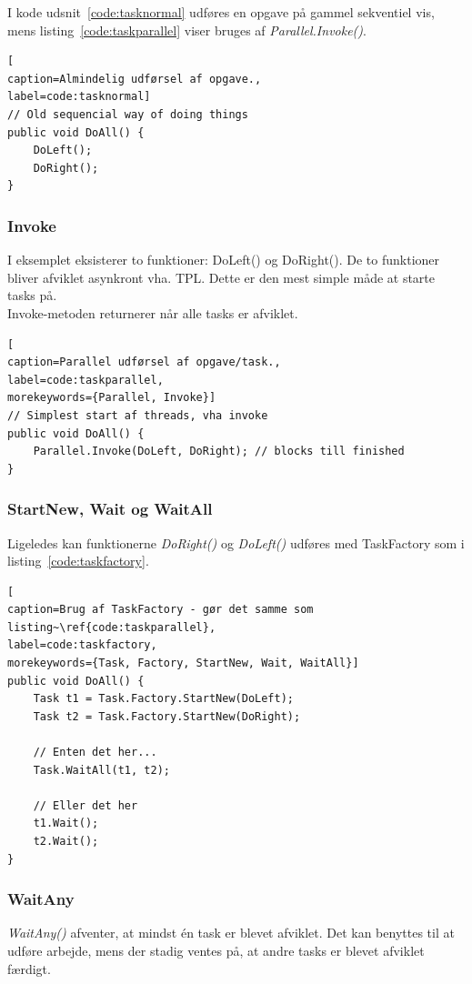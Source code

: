 I kode udsnit~\ref{code:tasknormal} udføres en opgave på gammel sekventiel vis, mens listing~\ref{code:taskparallel} viser bruges af \textit{Parallel.Invoke()}.

\begin{lstlisting}[
caption=Almindelig udførsel af opgave.,
label=code:tasknormal]
// Old sequencial way of doing things
public void DoAll() {
	DoLeft();
	DoRight();
}
\end{lstlisting}

\subsubsection{Invoke}
I eksemplet eksisterer to funktioner: DoLeft() og DoRight(). De to funktioner bliver afviklet asynkront vha. TPL. Dette er den mest simple måde at starte tasks på.\\

Invoke-metoden returnerer når alle tasks er afviklet.
\begin{lstlisting}[
caption=Parallel udførsel af opgave/task.,
label=code:taskparallel,
morekeywords={Parallel, Invoke}]
// Simplest start af threads, vha invoke
public void DoAll() {
	Parallel.Invoke(DoLeft, DoRight); // blocks till finished
}
\end{lstlisting}

\subsubsection{StartNew, Wait og WaitAll}
Ligeledes kan funktionerne \textit{DoRight()} og \textit{DoLeft()} udføres med TaskFactory som i listing~\ref{code:taskfactory}.

\begin{lstlisting}[
caption=Brug af TaskFactory - gør det samme som listing~\ref{code:taskparallel},
label=code:taskfactory,
morekeywords={Task, Factory, StartNew, Wait, WaitAll}]
public void DoAll() {
	Task t1 = Task.Factory.StartNew(DoLeft);
	Task t2 = Task.Factory.StartNew(DoRight);
	
	// Enten det her...
	Task.WaitAll(t1, t2);
	
	// Eller det her
	t1.Wait();
	t2.Wait();
}
\end{lstlisting}

\subsubsection{WaitAny}
\textit{WaitAny()} afventer, at mindst én task er blevet afviklet. Det kan benyttes til at udføre arbejde, mens der stadig ventes på, at andre tasks er blevet afviklet færdigt.

